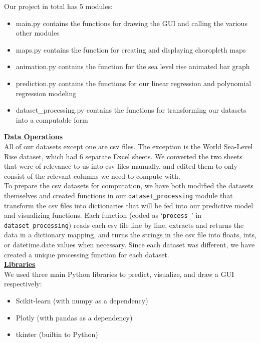\documentclass[fontsize=11pt]{article}
\begin{document}
Our project in total has 5 modules:

\begin{itemize}
    \item main.py contains the functions for drawing the GUI and calling the various other modules
    \item maps.py contains the function for creating and displaying choropleth maps
    \item animation.py contains the function for the sea level rise animated bar graph
    \item prediction.py contains the functions for our linear regression and polynomial regression modeling
    \item dataset\_processing.py contains the functions for transforming our datasets into a computable form
\end{itemize}

\underline{\textbf{Data Operations}}\\

All of our datasets except one are csv files. The exception is the World Sea-Level Rise dataset, which had 6 separate Excel sheets. We converted the two sheets that were of relevance to us into csv files manually, and edited them to only consist of the relevant columns we need to compute with.\\

To prepare the csv datasets for computation, we have both modified the datasets themselves and created functions in our \texttt{dataset\_processing} module that transform the csv files into dictionaries that will be fed into our predictive model and visualizing functions. Each function (coded as ‘\texttt{process\_<dependant-variable-of-dataset>}’ in \texttt{dataset\_processing}) reads each csv file line by line, extracts and returns the data in a dictionary mapping, and turns the strings in the csv file into floats, ints, or datetime.date values when necessary. Since each dataset was different, we have created a unique processing function for each dataset.\\

\underline{\textbf{Libraries}}\\

We used three main Python libraries to predict, visualize, and draw a GUI respectively:

\begin{itemize}
    \item Scikit-learn (with numpy as a dependency)
    \item Plotly (with pandas as a dependency)
    \item tkinter (builtin to Python)
\end{itemize}
\end{document}
